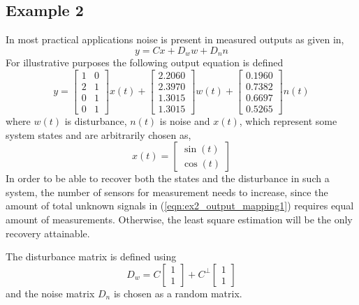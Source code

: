 \subsection{Example 2}
In most practical applications noise is present in measured outputs as given in,
\begin{equation}
    y=Cx+D_w w+D_n n\label{eqn:ex2_output_mapping1}
\end{equation}
For illustrative purposes the following output equation is defined
\begin{equation}
    y=\begin{bmatrix}
    1&     0\\
    2&     1\\
    0&     1\\
    0&     1
    \end{bmatrix}x(t)+\begin{bmatrix}
        2.2060\\
        2.3970\\
        1.3015\\
        1.3015
    \end{bmatrix}w(t)+
    \begin{bmatrix}
    0.1960\\
    0.7382\\
    0.6697\\
    0.5265
    \end{bmatrix}n(t)
\end{equation}
where $w(t)$ is disturbance, $n(t)$ is noise and $x(t)$, which represent some system states and  are arbitrarily chosen as,
\begin{equation}
    x(t)=\begin{bmatrix}
        \sin(t)\\ \cos(t)
    \end{bmatrix}
\end{equation}
In order to be able to recover both the states and the disturbance in such a system, the number of sensors for measurement needs to increase, since the amount of total unknown signals in (\ref{eqn:ex2_output_mapping1}) requires equal amount of measurements. Otherwise, the least square estimation will be the only recovery attainable. 

The disturbance matrix is defined using 
\begin{equation}
    D_w=C\begin{bmatrix}1\\1\end{bmatrix}+C^\perp\begin{bmatrix}1\\1\end{bmatrix}
\end{equation}
and the noise matrix $D_n$ is chosen as a random matrix.

